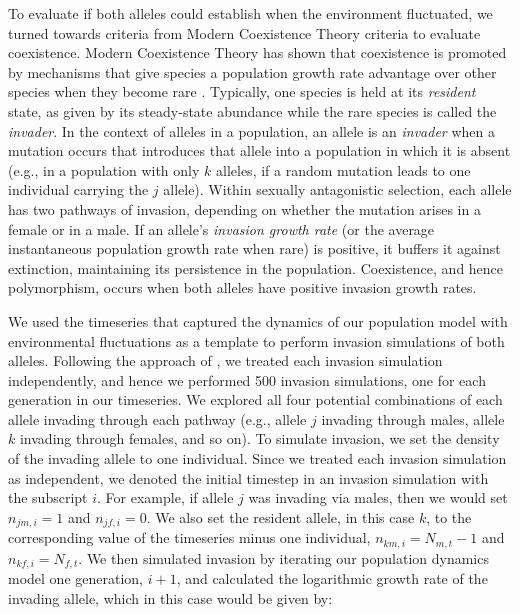 \documentclass[12pt]{article}
\begin{document}
 To evaluate if both alleles could establish when the environment fluctuated, we turned towards criteria from Modern Coexistence Theory criteria to evaluate coexistence. Modern Coexistence Theory has shown that coexistence is promoted by mechanisms that give species a population growth rate advantage over other species when they become rare \citep{chesson_stabilizing_1982, chesson2003quantifying, barabas_chessons_2018}. Typically, one species is held at its \textit{resident} state, as given by its steady-state abundance while the rare species is called the \textit{invader}. In the context of alleles in a population, an allele is an \textit{invader} when a mutation occurs that introduces that allele into a population in which it is absent (e.g., in a population with only $k$ alleles, if a random mutation leads to one individual carrying the $j$ allele). Within sexually antagonistic selection, each allele has two pathways of invasion, depending on whether the mutation arises in a female or in a male. If an allele's \textit{invasion growth rate} (or the average instantaneous population growth rate when rare) is positive, it buffers it against extinction, maintaining its persistence in the population.  Coexistence, and hence polymorphism, occurs when both alleles have positive invasion growth rates.

We used the timeseries that captured the dynamics of our population model with environmental fluctuations as a template to perform invasion simulations of both alleles. Following the approach of \citet{shoemaker2020}, we treated each invasion simulation independently, and hence we performed 500 invasion simulations, one for each generation in our timeseries. We explored all four potential combinations of each allele invading through each pathway (e.g., allele $j$ invading through males, allele $k$ invading through females, and so on). To simulate invasion, we set the density of the invading allele to one individual. Since we treated each invasion simulation as independent, we denoted the initial timestep in an invasion simulation with the subscript $i$. For example, if allele $j$ was invading via males, then we would set $n_{jm,i} = 1$ and $n_{jf,i}= 0$. We also set the resident allele, in this case $k$, to the corresponding value of the timeseries minus one individual, $n_{km,i} = N_{m,t} -1$ and $n_{kf,i} = N_{f,t}$. We then simulated invasion by iterating our population dynamics model one generation, $i+1$, and calculated the logarithmic growth rate of the invading allele, which in this case would be given by:
\end{document}
